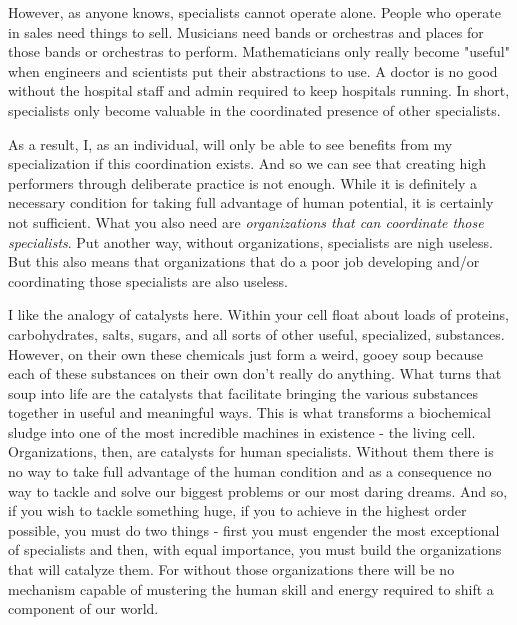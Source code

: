 \documentclass[11pt,a5paper]{book}
\begin{document}
However, as anyone knows, specialists cannot operate alone. People who operate in sales need things to sell. Musicians need bands or orchestras and places for those bands or orchestras to perform. Mathematicians only really become "useful" when engineers and scientists put their abstractions to use. A doctor is no good without the hospital staff and admin required to keep hospitals running. In short, specialists only become valuable in the coordinated presence of other specialists.
\newline

As a result, I, as an individual, will only be able to see benefits from my specialization if this coordination exists. And so we can see that creating high performers through deliberate practice is not enough. While it is definitely a necessary condition for taking full advantage of human potential, it is certainly not sufficient. What you also need are \textit{organizations that can coordinate those specialists}. Put another way, without organizations, specialists are nigh useless. But this also means that organizations that do a poor job developing and/or coordinating those specialists are also useless. 
\newline 

I like the analogy of catalysts here. Within your cell float about loads of proteins, carbohydrates, salts, sugars, and all sorts of other useful, specialized, substances. However, on their own these chemicals just form a weird, gooey soup because each of these substances on their own don't really do anything. What turns that soup into life are the catalysts that facilitate bringing the various substances together in useful and meaningful ways. This is what transforms a biochemical sludge into one of the most incredible machines in existence - the living cell. Organizations, then, are catalysts for human specialists. Without them there is no way to take full advantage of the human condition and as a consequence no way to tackle and solve our biggest problems or our most daring dreams. And so, if you wish to tackle something huge, if you to achieve in the highest order possible, you must do two things - first you must engender the most exceptional of specialists and then, with equal importance, you must build the organizations that will catalyze them. For without those organizations there will be no mechanism capable of mustering the human skill and energy required to shift a component of our world.

\nocite{duckworth} \nocite{outliers}
\end{document}
